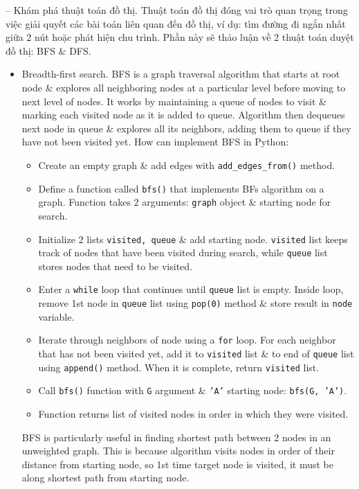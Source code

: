 \documentclass{article}
\begin{document}
\begin{itemize}
\begin{itemize}
        -- {\sf Khám phá thuật toán đồ thị.} Thuật toán đồ thị đóng vai trò quan trọng trong việc giải quyết các bài toán liên quan đến đồ thị, ví dụ: tìm đường đi ngắn nhất giữa 2 nút hoặc phát hiện chu trình. Phần này sẽ thảo luận về 2 thuật toán duyệt đồ thị: BFS \& DFS.
        \begin{itemize}
            \item {\sf Breadth-first search.} BFS is a graph traversal algorithm that starts at root node \& explores all neighboring nodes at a particular level before moving to next level of nodes. It works by maintaining a queue of nodes to visit \& marking each visited node as it is added to queue. Algorithm then dequeues next node in queue \& explores all its neighbors, adding them to queue if they have not been visited yet. How can implement BFS in Python:
            \begin{itemize}
                \item Create an empty graph \& add edges with \verb|add_edges_from()| method.
                \item Define a function called {\tt bfs()} that implements BFs algorithm on a graph. Function takes 2 arguments: {\tt graph} object \& starting node for search.
                \item Initialize 2 lists {\tt visited, queue} \& add starting node. {\tt visited} list keeps track of nodes that have been visited during search, while {\tt queue} list stores nodes that need to be visited.
                \item Enter a {\tt while} loop that continues until {\tt queue} list is empty. Inside loop, remove 1st node in {\tt queue} list using {\tt pop(0)} method \& store result in {\tt node} variable.
                \item Iterate through neighbors of node using a {\tt for} loop. For each neighbor that has not been visited yet, add it to {\tt visited} list \& to end of {\tt queue} list using {\tt append()} method. When it is complete, return {\tt visited} list.
                \item Call {\tt bfs()} function with {\tt G} argument \& {\tt'A'} starting node: {\tt bfs(G, 'A')}.
                \item Function returns list of visited nodes in order in which they were visited.
            \end{itemize}
            BFS is particularly useful in finding shortest path between 2 nodes in an unweighted graph. This is because algorithm visits nodes in order of their distance from starting node, so 1st time target node is visited, it must be along shortest path from starting node.


\end{itemize}
\end{itemize}
\end{itemize}
\end{document}
